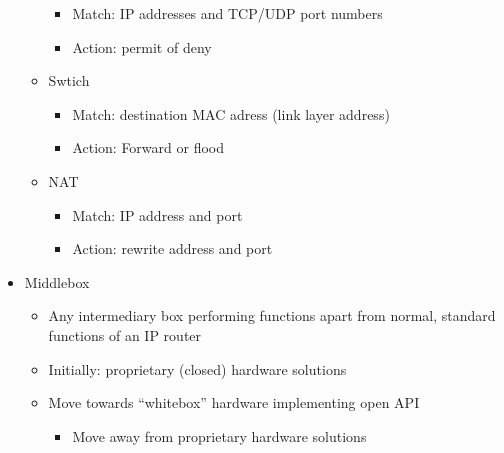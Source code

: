 \begin{itemize}
\begin{itemize}
        \begin{itemize}

          \item Match: IP addresses and TCP/UDP port numbers

          \item Action: permit of deny

        \end{itemize}

      \item Swtich

        \begin{itemize}

          \item Match: destination MAC adress (link layer address)

          \item Action: Forward or flood

        \end{itemize}

      \item NAT

        \begin{itemize}

          \item Match: IP address and port

          \item Action: rewrite address and port

        \end{itemize}

    \end{itemize}

  \item Middlebox

    \begin{itemize}

      \item Any intermediary box performing functions apart from normal, standard functions of an IP router

      \item Initially: proprietary (closed) hardware solutions

      \item Move towards ``whitebox'' hardware implementing open API

        \begin{itemize}

          \item Move away from proprietary hardware solutions


\end{itemize}
\end{itemize}
\end{itemize}
